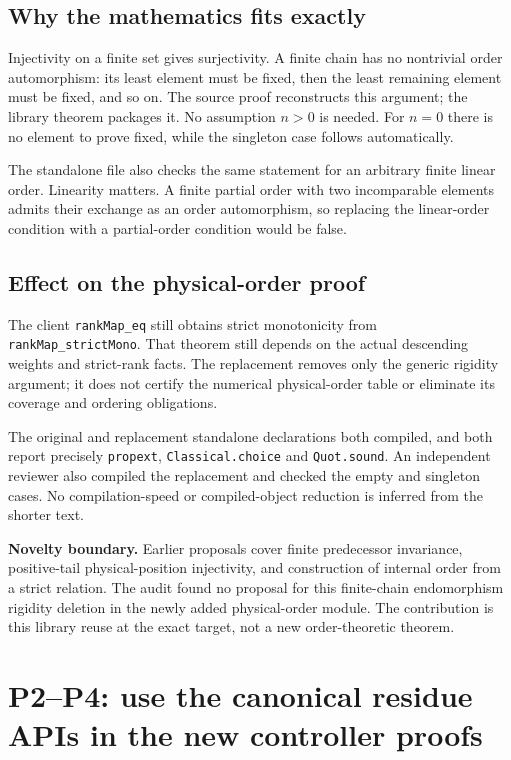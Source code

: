 \documentclass[11pt]{article}
\newcommand{\code}[1]{\nolinkurl{#1}}
\begin{document}
\subsection*{Why the mathematics fits exactly}

Injectivity on a finite set gives surjectivity. A finite chain has no nontrivial order automorphism: its least element must be fixed, then the least remaining element must be fixed, and so on. The source proof reconstructs this argument; the library theorem packages it. No assumption $n>0$ is needed. For $n=0$ there is no element to prove fixed, while the singleton case follows automatically.

The standalone file also checks the same statement for an arbitrary finite linear order. Linearity matters. A finite partial order with two incomparable elements admits their exchange as an order automorphism, so replacing the linear-order condition with a partial-order condition would be false.

\subsection*{Effect on the physical-order proof}

The client \code{rankMap_eq} still obtains strict monotonicity from \code{rankMap_strictMono}. That theorem still depends on the actual descending weights and strict-rank facts. The replacement removes only the generic rigidity argument; it does not certify the numerical physical-order table or eliminate its coverage and ordering obligations.

The original and replacement standalone declarations both compiled, and both report precisely \code{propext}, \code{Classical.choice} and \code{Quot.sound}. An independent reviewer also compiled the replacement and checked the empty and singleton cases. No compilation-speed or compiled-object reduction is inferred from the shorter text.

\textbf{Novelty boundary.} Earlier proposals cover finite predecessor invariance, positive-tail physical-position injectivity, and construction of internal order from a strict relation. The audit found no proposal for this finite-chain endomorphism rigidity deletion in the newly added physical-order module. The contribution is this library reuse at the exact target, not a new order-theoretic theorem.

\section{P2--P4: use the canonical residue APIs in the new controller proofs}
\end{document}
